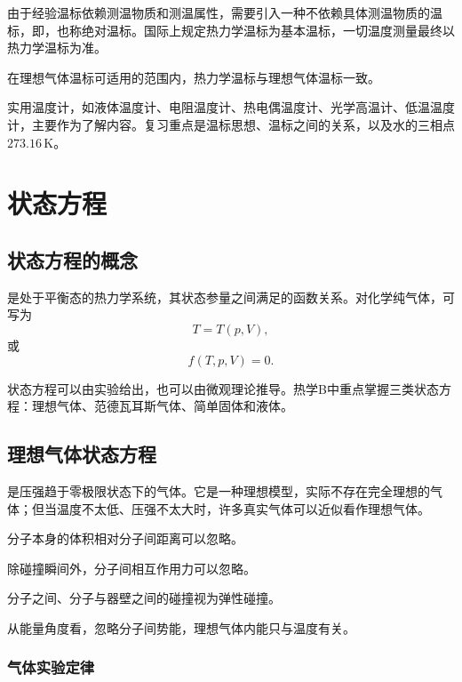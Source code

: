 由于经验温标依赖测温物质和测温属性，需要引入一种不依赖具体测温物质的温标，即，也称绝对温标。国际上规定热力学温标为基本温标，一切温度测量最终以热力学温标为准。

在理想气体温标可适用的范围内，热力学温标与理想气体温标一致。

\begin{WarnBox}[热学B复习边界]
实用温度计，如液体温度计、电阻温度计、热电偶温度计、光学高温计、低温温度计，主要作为了解内容。复习重点是温标思想、温标之间的关系，以及水的三相点 \(273.16\,\mathrm K\)。
\end{WarnBox}

\section{状态方程}

\subsection{状态方程的概念}

是处于平衡态的热力学系统，其状态参量之间满足的函数关系。对化学纯气体，可写为
\[
  T=T(p,V),
\]
或
\[
  f(T,p,V)=0.
\]

状态方程可以由实验给出，也可以由微观理论推导。热学B中重点掌握三类状态方程：理想气体、范德瓦耳斯气体、简单固体和液体。

\subsection{理想气体状态方程}

是压强趋于零极限状态下的气体。它是一种理想模型，实际不存在完全理想的气体；但当温度不太低、压强不太大时，许多真实气体可以近似看作理想气体。

\begin{KeyBox}[理想气体模型]
\begin{ReviewList}
  \item 分子本身的体积相对分子间距离可以忽略。
  \item 除碰撞瞬间外，分子间相互作用力可以忽略。
  \item 分子之间、分子与器壁之间的碰撞视为弹性碰撞。
  \item 从能量角度看，忽略分子间势能，理想气体内能只与温度有关。
\end{ReviewList}
\end{KeyBox}

\subsubsection{气体实验定律}

